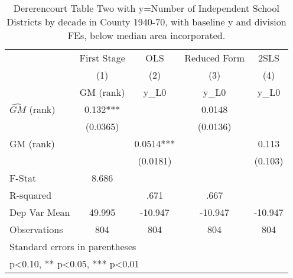 \begin{table}[htbp]\centering
\def\sym#1{\ifmmode^{#1}\else\(^{#1}\)\fi}
\caption{Dererencourt Table Two with y=Number of Independent School Districts by decade in County 1940-70, with baseline y and division FEs, below median area incorporated.}
\begin{tabular}{l*{4}{c}}
\toprule
                    & First Stage   &         OLS   &Reduced Form   &        2SLS   \\
                    &\multicolumn{1}{c}{(1)}&\multicolumn{1}{c}{(2)}&\multicolumn{1}{c}{(3)}&\multicolumn{1}{c}{(4)}\\
                    &\multicolumn{1}{c}{GM  (rank)}&\multicolumn{1}{c}{y\_L0}&\multicolumn{1}{c}{y\_L0}&\multicolumn{1}{c}{y\_L0}\\
\midrule
$\hat{GM}$ (rank)   &       0.132***&               &      0.0148   &               \\
                    &    (0.0365)   &               &    (0.0136)   &               \\
\addlinespace
GM  (rank)          &               &      0.0514***&               &       0.113   \\
                    &               &    (0.0181)   &               &     (0.103)   \\
\midrule
F-Stat              &       8.686   &               &               &               \\
R-squared           &               &        .671   &        .667   &               \\
Dep Var Mean        &      49.995   &     -10.947   &     -10.947   &     -10.947   \\
Observations        &         804   &         804   &         804   &         804   \\
\bottomrule
\multicolumn{5}{l}{\footnotesize Standard errors in parentheses}\\
\multicolumn{5}{l}{\footnotesize * p<0.10, ** p<0.05, *** p<0.01}\\
\end{tabular}
\end{table}
